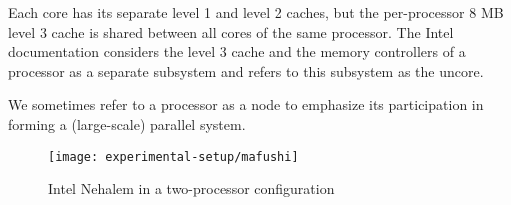 Each core has its separate level 1 and level 2 caches, but the
per-processor 8 MB level 3 cache is shared between all cores of the
same processor. The Intel documentation considers the level 3 cache
and the memory controllers of a processor as a separate subsystem and
refers to this subsystem as the uncore. 

We sometimes refer to a processor as a node to emphasize its
participation in forming a (large-scale) parallel system.

\begin{figure}[htb]
  \centering
  \texttt{[image: experimental-setup/mafushi]}
  \caption[Intel Nehalem in a two-processor configuration]{Intel
    Nehalem in a two-processor configuration}
  \label{fig:experimental-setup-mafushi}
\end{figure}


